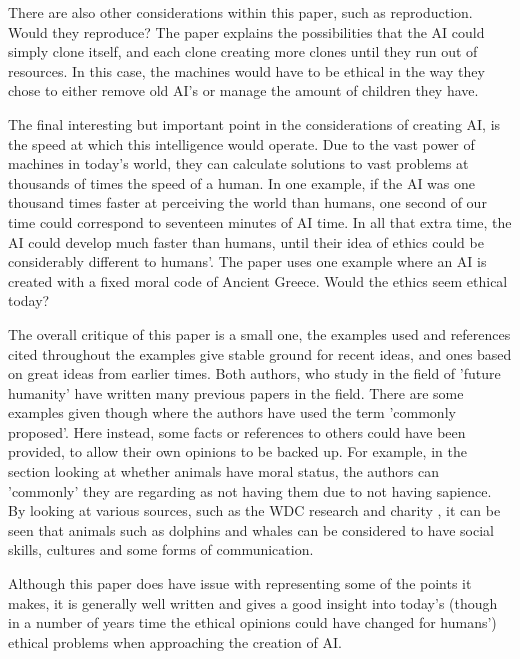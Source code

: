 \documentclass[article]{IEEEtran}
\begin{document}
There are also other considerations within this paper, such as reproduction. Would they reproduce? The paper explains the possibilities that the AI could simply clone itself, and each clone creating more clones until they run out of resources. In this case, the machines would have to be ethical in the way they chose to either remove old AI's or manage the amount of children they have.\par
The final interesting but important point in the considerations of creating AI, is the speed at which this intelligence would operate. Due to the vast power of machines in today's world, they can calculate solutions to vast problems at thousands of times the speed of a human. In one example, if the AI was one thousand times faster at perceiving the world than humans, one second of our time could correspond to seventeen minutes of AI time. In all that extra time, the AI could develop much faster than humans, until their idea of ethics could be considerably different to humans'. The paper uses one example where an AI is created with a fixed moral code of Ancient Greece. Would the ethics seem ethical today?  \par
The overall critique of this paper is a small one, the examples used and references cited throughout the examples give stable ground for recent ideas, and ones based on great ideas from earlier times. Both authors, who study in the field of 'future humanity' have written many previous papers in the field. There are some examples given though where the authors have used the term 'commonly proposed'. Here instead, some facts or references to others could have been provided, to allow their own opinions to be backed up. For example, in the section looking at whether animals have moral status, the authors can 'commonly' they are regarding as not having them due to not having sapience. By looking at various sources, such as the WDC research and charity \cite{whales},  it can be seen that animals such as dolphins and whales can be considered to have social skills, cultures and some forms of communication. \par 
Although this paper does have issue with representing some of the points it makes, it is generally well written and gives a good insight into today's (though in a number of years time the ethical opinions could have changed for humans') ethical problems when approaching the creation of AI.
\end{document}
